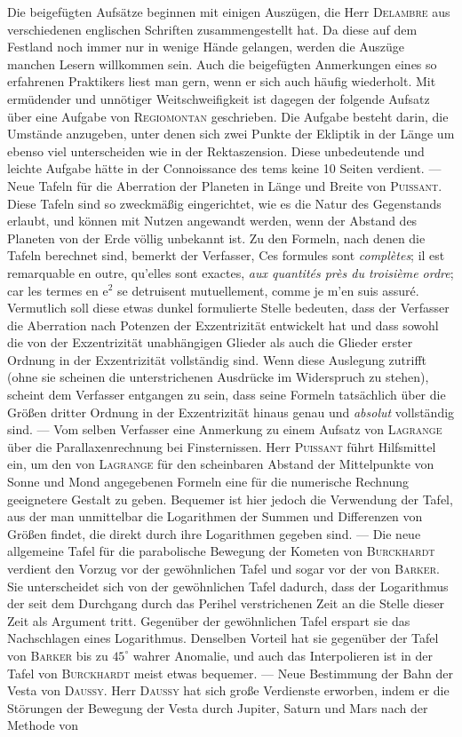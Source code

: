 Die beigefügten Aufsätze beginnen mit einigen Auszügen, die Herr \textsc{Delambre} aus verschiedenen englischen Schriften zusammengestellt hat. Da diese auf dem Festland noch immer nur in wenige Hände gelangen, werden die Auszüge manchen Lesern willkommen sein. Auch die beigefügten Anmerkungen eines so erfahrenen Praktikers liest man gern, wenn er sich auch häufig wiederholt. Mit ermüdender und unnötiger Weitschweifigkeit ist dagegen der folgende Aufsatz über eine Aufgabe von \textsc{Regiomontan} geschrieben. Die Aufgabe besteht darin, die Umstände anzugeben, unter denen sich zwei Punkte der Ekliptik in der Länge um ebenso viel unterscheiden wie in der Rektaszension. Diese unbedeutende und leichte Aufgabe hätte in der Connoissance des tems keine 10 Seiten verdient. --- Neue Tafeln für die Aberration der Planeten in Länge und Breite von \textsc{Puissant}. Diese Tafeln sind so zweckmäßig eingerichtet, wie es die Natur des Gegenstands erlaubt, und können mit Nutzen angewandt werden, wenn der Abstand des Planeten von der Erde völlig unbekannt ist. Zu den Formeln, nach denen die Tafeln berechnet sind, bemerkt der Verfasser, Ces formules sont \emph{complètes}; il est remarquable en outre, qu'elles sont exactes, \emph{aux quantités près du troisième ordre}; car les termes en $\mathrm{e}^2$ se detruisent mutuellement, comme je m'en suis assuré. Vermutlich soll diese etwas dunkel formulierte Stelle bedeuten, dass der Verfasser die Aberration nach Potenzen der Exzentrizität entwickelt hat und dass sowohl die von der Exzentrizität unabhängigen Glieder als auch die Glieder erster Ordnung in der Exzentrizität vollständig sind. Wenn diese Auslegung zutrifft (ohne sie scheinen die unterstrichenen Ausdrücke im Widerspruch zu stehen), scheint dem Verfasser entgangen zu sein, dass seine Formeln tatsächlich über die Größen dritter Ordnung in der Exzentrizität hinaus genau und \emph{absolut} vollständig sind. --- Vom selben Verfasser eine Anmerkung zu einem Aufsatz von \textsc{Lagrange} über die Parallaxenrechnung bei Finsternissen. Herr \textsc{Puissant} führt Hilfsmittel ein, um den von \textsc{Lagrange} für den scheinbaren Abstand der Mittelpunkte von Sonne und Mond angegebenen Formeln eine für die numerische Rechnung geeignetere Gestalt zu geben. Bequemer ist hier jedoch die Verwendung der Tafel, aus der man unmittelbar die Logarithmen der Summen und Differenzen von Größen findet, die direkt durch ihre Logarithmen gegeben sind. --- Die neue allgemeine Tafel für die parabolische Bewegung der Kometen von \textsc{Burckhardt} verdient den Vorzug vor der gewöhnlichen Tafel und sogar vor der von \textsc{Barker}. Sie unterscheidet sich von der gewöhnlichen Tafel dadurch, dass der Logarithmus der seit dem Durchgang durch das Perihel verstrichenen Zeit an die Stelle dieser Zeit als Argument tritt. Gegenüber der gewöhnlichen Tafel erspart sie das Nachschlagen eines Logarithmus. Denselben Vorteil hat sie gegenüber der Tafel von \textsc{Barker} bis zu $45^\circ$ wahrer Anomalie, und auch das Interpolieren ist in der Tafel von \textsc{Burckhardt} meist etwas bequemer. --- Neue Bestimmung der Bahn der Vesta von \textsc{Daussy}. Herr \textsc{Daussy} hat sich große Verdienste erworben, indem er die Störungen der Bewegung der Vesta durch Jupiter, Saturn und Mars nach der Methode von 